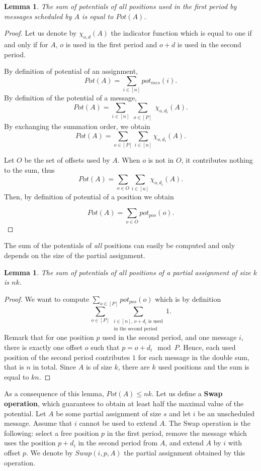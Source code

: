 \documentclass[pdflatex,sn-mathphys,iicol]{sn-jnl}%
\theoremstyle{thmstyleone}%
\newtheorem{lemma}[theorem]{Lemma}
\theoremstyle{thmstyletwo}%
\theoremstyle{thmstylethree}%
\begin{document}
\begin{lemma}\label{lemma:pot_pos}
The sum of potentials of all positions used in the first period by messages scheduled by $A$ is equal to $Pot(A)$.  
\end{lemma}
\begin{proof}
 Let us denote by $\chi_{o,d}(A)$ the indicator function which is equal to one if and only if for $A$, $o$ is used in the first period and $o+d$ is used in the second period.

By definition of potential of an assignment, 
$$Pot(A) = \sum_{i \in [n]} pot_{mes}(i).$$
By definition of the potential of a message, 
$$\displaystyle{Pot(A) = \sum_{i \in [n]} \sum_{\substack{o \in [P]}} \chi_{o,d_i}(A) }.$$
By exchanging the summation order, we obtain
$$\displaystyle{Pot(A) = \sum_{o \in [P] }\sum_{i \in [n]} \chi_{o,d_i}(A)}.$$

Let $O$ be the set of offsets used by $A$.
When $o$ is not in $O$, it contributes nothing to the sum, thus
$$\displaystyle{Pot(A) = \sum_{o \in O} \sum_{i \in [n]} \chi_{o,d_i}(A) }.$$
Then, by definition of potential of a position we obtain

$$\displaystyle{Pot(A) = \sum_{o \in O} pot_{pos}(o)}.$$
\end{proof}

The sum of the potentials of \emph{all} positions can easily be computed and only depends on the size of the partial assignment.

\begin{lemma}\label{lemma:inv}
The sum of potentials of all positions of a partial assignment of size $k$ is $nk$.  
\end{lemma}
\begin{proof}
We want to compute $\sum_{o \in [P]} pot_{pos}(o)$ which is by definition
$$\sum_{o \in [P]} \sum_{\substack {i \in [n],\, o + d_i \text{ is used} \\ \text{in the second period}}} 1.$$
Remark that for one position $p$ used in the second period, and one message $i$, there is exactly one offset $o$ such that $p = o+d_i \mod P$.
Hence, each used position of the second period contributes $1$ for each message in the double sum, that is $n$ in total.
Since $A$ is of size $k$, there are $k$ used positions and the sum is equal to $kn$.
\end{proof}

 As a consequence of this lemma, $Pot(A) \leq nk$. Let us define a \textbf{Swap operation}, which guarantees to obtain at least half the maximal value of the potential. Let $A$ be some partial assignment of size $s$ and let $i$ be an unscheduled message. Assume that $i$ cannot be used to extend $A$. The Swap operation is the following: 
select a free position $p$ in the first period, remove the message which uses the position $p+d_i$ in the second period from $A$, and extend $A$ by $i$ with offset $p$. We denote by $Swap(i,p,A)$ the partial assignment obtained by this operation.
\end{document}
